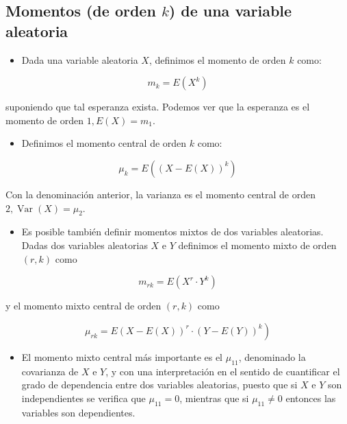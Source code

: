\documentclass[
]{article}
\providecommand{\tightlist}{%
  \setlength{\itemsep}{0pt}\setlength{\parskip}{0pt}}
\begin{document}
\subsection{\texorpdfstring{Momentos (de orden \(k\)) de una variable aleatoria}{Momentos (de orden k) de una variable aleatoria}}\label{momentos-de-orden-k-de-una-variable-aleatoria}

\begin{itemize}
\tightlist
\item
  Dada una variable aleatoria \(X\), definimos el momento de orden \(k\)
  como:
\end{itemize}

\[
m_{k}=E\left(X^{k}\right)
\]

suponiendo que tal esperanza exista. Podemos ver que la esperanza es el
momento de orden \(1, E(X)=m_{1}\).

\begin{itemize}
\tightlist
\item
  Definimos el momento central de orden \(k\) como:
\end{itemize}

\[
\mu_{k}=E\left((X-E(X))^{k}\right)
\]

Con la denominación anterior, la varianza es el momento central de orden
\(2, \operatorname{Var}(X)=\mu_{2}\).

\begin{itemize}
\tightlist
\item
  Es posible también definir momentos mixtos de dos variables
  aleatorias. Dadas dos variables aleatorias \(X\) e \(Y\) definimos el
  momento mixto de orden \((r, k)\) como
\end{itemize}

\[
m_{r k}=E\left(X^{r} \cdot Y^{k}\right)
\]

y el momento mixto central de orden \((r, k)\) como

\[
\left.\mu_{r k}=E(X-E(X))^{r} \cdot(Y-E(Y))^{k}\right)
\]

\begin{itemize}
\tightlist
\item
  El momento mixto central más importante es el \(\mu_{11}\), denominado
  la covarianza de \(X\) e \(Y\), y con una interpretación en el sentido
  de cuantificar el grado de dependencia entre dos variables
  aleatorias, puesto que si \(X\) e \(Y\) son independientes se verifica
  que \(\mu_{11}=0\), mientras que si \(\mu_{11} \neq 0\) entonces las
  variables son dependientes.
\end{itemize}
\end{document}
